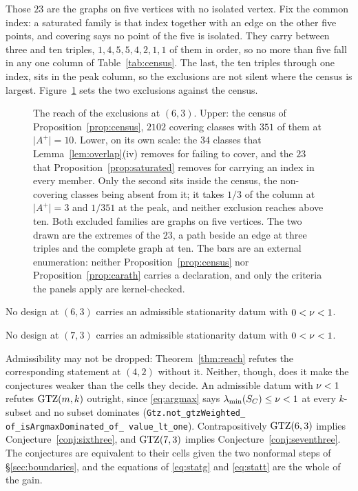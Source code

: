 Those $23$ are the graphs on five vertices with no isolated vertex.  Fix
the common index: a saturated family is that index together with an edge on
the other five points, and covering says no point of the five is isolated.
They carry between three and ten triples, $1,4,5,5,4,2,1,1$ of them in
order, so no more than five fall in any one column of
Table~\ref{tab:census}.  The last, the ten triples through one index, sits
in the peak column, so the exclusions are not silent where the census is
largest.  Figure~\ref{fig:exclusionreach} sets the two exclusions against
the census.


\begin{figure}[ht]
  \centering
  
  \caption{The reach of the exclusions at $(6,3)$.  Upper: the census of
  Proposition~\ref{prop:census}, $2102$ covering classes with $351$ of them at
  $\lvert A^{+}\rvert=10$.  Lower, on its own scale: the $34$ classes that
  Lemma~\ref{lem:overlap}(iv) removes for failing to cover, and the $23$ that
  Proposition~\ref{prop:saturated} removes for carrying an index in every
  member.  Only the second sits inside the census, the non-covering classes
  being absent from it; it takes $1/3$ of the column at $\lvert A^{+}\rvert=3$
  and $1/351$ at the peak, and neither exclusion reaches above ten.  Both
  excluded families are graphs on five vertices.  The two drawn are the
  extremes of the $23$, a path beside an edge at three triples and the complete
  graph at ten.  The bars are an external
  enumeration: neither Proposition~\ref{prop:census} nor
  Proposition~\ref{prop:carath} carries a declaration, and only the criteria
  the panels apply are kernel-checked.}
  \label{fig:exclusionreach}
\end{figure}

\begin{conjecture}\label{conj:sixthree}
No design at $(6,3)$ carries an admissible stationarity datum with
$0<\nu<1$.
\end{conjecture}

\begin{conjecture}\label{conj:seventhree}
No design at $(7,3)$ carries an admissible stationarity datum with
$0<\nu<1$.
\end{conjecture}

Admissibility may not be dropped: Theorem~\ref{thm:reach} refutes the
corresponding statement at $(4,2)$ without it.  Neither, though, does it
make the conjectures weaker than the cells they decide.  An admissible
datum with $\nu<1$ refutes $\mathrm{GTZ}(m,k)$ outright, since \eqref{eq:argmax}
says $\lambda_{\min}(S_{C})\le\nu<1$ at every $k$-subset and no subset dominates
(\texttt{Gtz.not\_\allowbreak gtz\allowbreak Weighted\_\allowbreak
of\_\allowbreak is\allowbreak Argmax\allowbreak Dominated\_\allowbreak of\_\allowbreak
value\_\allowbreak lt\_one}).
Contrapositively $\mathrm{GTZ}(6,3)$ implies Conjecture~\ref{conj:sixthree}, and
$\mathrm{GTZ}(7,3)$ implies Conjecture~\ref{conj:seventhree}.  The conjectures are
equivalent to their cells given the two nonformal steps of
\S\ref{sec:boundaries}, and the equations of \eqref{eq:statg} and
\eqref{eq:statt} are the whole of the gain.

